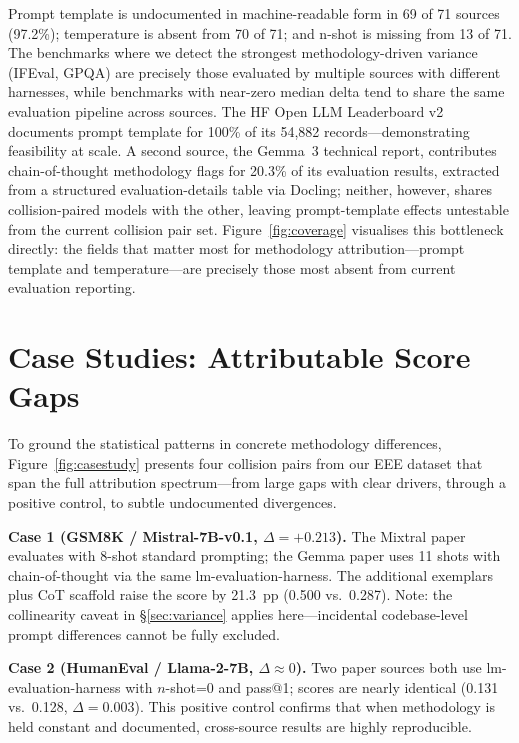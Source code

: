 \documentclass[11pt]{article}
\begin{document}
Prompt template is undocumented in machine-readable form in 69 of 71 sources (97.2\%);
temperature is absent from 70 of 71; and n-shot is missing from 13 of 71.
The benchmarks where we detect the strongest methodology-driven
variance (IFEval, GPQA) are precisely those evaluated by multiple
sources with different harnesses, while benchmarks with near-zero
median delta tend to share the same evaluation pipeline across sources.
The HF Open LLM Leaderboard v2 documents prompt template for 100\% of
its 54,882 records---demonstrating feasibility at scale.
A second source, the Gemma~3 technical report, contributes chain-of-thought
methodology flags for 20.3\% of its evaluation results, extracted from
a structured evaluation-details table via Docling; neither, however,
shares collision-paired models with the other, leaving prompt-template
effects untestable from the current collision pair set.
Figure~\ref{fig:coverage} visualises this bottleneck directly: the fields
that matter most for methodology attribution---prompt template and
temperature---are precisely those most absent from current evaluation reporting.

\section{Case Studies: Attributable Score Gaps}
\label{sec:casestudy}

To ground the statistical patterns in concrete methodology differences,
Figure~\ref{fig:casestudy} presents four collision pairs from our EEE
dataset that span the full attribution spectrum---from large gaps with
clear drivers, through a positive control, to subtle undocumented
divergences.

\textbf{Case 1 (GSM8K / Mistral-7B-v0.1, $\Delta = +0.213$).}
The Mixtral paper \citep{jiang-2024-mixtral} evaluates with 8-shot
standard prompting; the Gemma paper \citep{team-2024-gemma} uses 11 shots
with chain-of-thought via the same lm-evaluation-harness.
The additional exemplars plus CoT scaffold raise the score by
21.3~pp (0.500 vs.\ 0.287).
Note: the collinearity caveat in \S\ref{sec:variance} applies
here---incidental codebase-level prompt differences cannot be fully
excluded.

\textbf{Case 2 (HumanEval / Llama-2-7B, $\Delta \approx 0$).}
Two paper sources both use lm-evaluation-harness with $n$-shot=0 and pass@1;
scores are nearly identical (0.131 vs.\ 0.128, $\Delta = 0.003$).
This positive control confirms that when methodology is held constant
and documented, cross-source results are highly reproducible.
\end{document}
